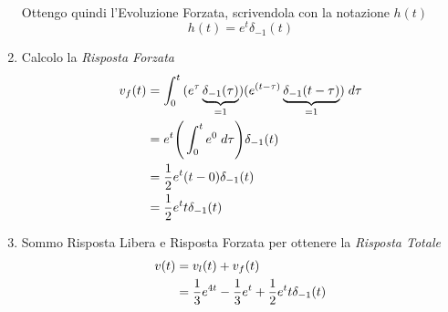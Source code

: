 \documentclass{article}
\begin{document}
\begin{enumerate}
\[\begin{aligned}
					  	\end{aligned}
					  \]
					  Ottengo quindi l'Evoluzione Forzata, scrivendola con la notazione $ h(t) $
					  \[
					  	h(t) = e^t\delta_{-1}(t)
					  \]
				\item Calcolo la \textit{Risposta Forzata}
					  \[
					  	\begin{aligned}
					  		v_f(t) &= \int_{0}^{t} {(e^{\tau}\underbrace{\delta_{-1}(\tau)}_{=1})(e^{(t-\tau)}\underbrace{\delta_{-1}(t-\tau)}_{=1})\; d\tau} \\
							&= e^t \Bigg( \int_{0}^{t} {e^0\; d\tau} \Bigg) \delta_{-1}(t) \\
							&= {{1}\over{2}}e^t (t-0) \delta_{-1}(t) \\
							&= {{1}\over{2}}e^t t \delta_{-1}(t)
					  	\end{aligned}
					  \]
				\item Sommo Risposta Libera e Risposta Forzata per ottenere la \textit{Risposta Totale}
					  \[
					  	\begin{aligned}
							v(t) &= v_l(t) + v_f(t) \\
					  		&= {{1}\over{3}}e^{4t} - {{1}\over{3}}e^t + {{1}\over{2}}e^t t \delta_{-1}(t)
					  	\end{aligned}
					  \]
			\end{enumerate}

		\newpage
\end{document}
